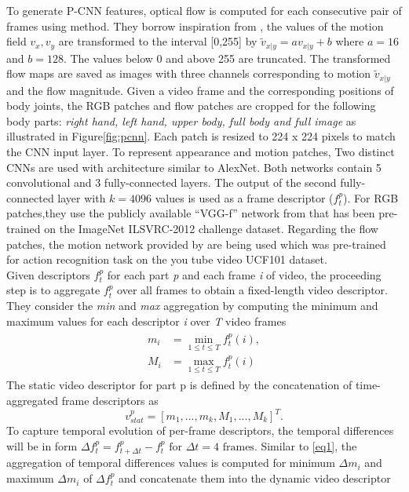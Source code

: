 \documentclass[10pt,twocolumn,letterpaper]{article}
\begin{document}
To generate P-CNN features, optical flow is computed for each consecutive pair of frames using \cite{brox2004high} method. They borrow inspiration from \cite{gkioxari2015finding}, the values of the motion field $v_{x},v_{y}$ are transformed to the interval [0,255] by $\tilde{v}_{x|y} = av_{x|y} + b$ where $a=16$ and $b=128$. The values below 0 and above
255 are truncated. The transformed flow maps are saved as images with three channels corresponding to motion $\tilde{v}_{x|y}$ and the flow magnitude.
Given a video frame and the corresponding positions of
body joints, the RGB patches and flow patches are cropped for the following body parts: \textit{right hand, left hand, upper body, full body and full image} as illustrated in Figure\ref{fig:pcnn}. Each patch is resized to 224 x 224 pixels to match the CNN input layer. To represent appearance and motion patches, Two distinct CNNs are used with architecture similar to AlexNet\cite{krizhevsky2012imagenet}. Both networks contain 5 convolutional and 3 fully-connected layers. The output of the second fully-connected layer with $k = 4096$ values is used as a frame descriptor ($f^{p}_{t}$). For RGB patches,they use the publicly available “VGG-f” network from \cite{chatfield2014return} that has been pre-trained on the ImageNet ILSVRC-2012 challenge dataset. Regarding the flow patches, the motion network provided by \cite{gkioxari2015finding} are being used which was pre-trained for action recognition task on the you tube video UCF101 dataset. \\
Given descriptors $f^{p}_{t}$ for each part \textit{p} and each frame \textit{i} of video, the proceeding step is to aggregate $f^{p}_{t}$ over all frames to obtain a fixed-length video descriptor. They consider the \textit{min} and \textit{max} aggregation by computing the minimum and maximum values for each descriptor \textit{i} over \textit{T} video frames
\begin{align} \label{eq1}
	\begin{split}
		m_{i} &= \min_{1 \leq t \leq T} f^{p}_{t}(i), \\
		M_{i} & = \max_{1 \leq t \leq T} f^{p}_{t}(i)
		\end{split}
\end{align}
The static video descriptor for part p is defined by the concatenation of time-aggregated frame descriptors as
\begin{equation} \label{eq2}
	v^{p}_{stat} = [m_{1},...,m_{k},M_{1},...,M_{k}]^{T}.
\end{equation}
To capture temporal evolution of per-frame descriptors, the temporal differences will be in form $\displaystyle \Delta f^{p}_{t} = f^{p}_{t+\Delta t} - f^{p}_{t} \text{ for } \Delta t=4 \text{ frames}$. Similar to \eqref{eq1}, the aggregation of temporal differences values is computed for minimum $\Delta m_{i}$ and maximum  $\Delta m_{i}$ of $\Delta f^{p}_{t}$ and concatenate them into the dynamic video descriptor
\end{document}

